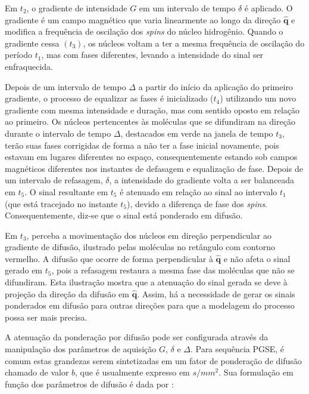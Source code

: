 \documentclass[
    12pt,                %
    oneside,            %
    a4paper,            %
    english,            %
    french,                %
    spanish,            %
    brazil                %
    ]{abntex2}
\begin{document}
Em $t_2$, o gradiente de intensidade $G$ em um intervalo de tempo $\delta$ é aplicado. O gradiente é um campo magnético que varia linearmente ao longo da direção $\mathbf{\hat{q}}$ e modifica a frequência de oscilação dos \textit{spins} do núcleo hidrogênio. Quando o gradiente cessa $(t_3)$, os núcleos voltam a ter a mesma frequência de oscilação do período $t_1$, mas com fases diferentes, levando a intensidade do sinal ser enfraquecida.

Depois de um intervalo de tempo $\Delta$ a partir do início da aplicação do primeiro gradiente, o processo de equalizar as fases é inicializado ($t_4$) utilizando um novo gradiente com mesma intensidade e duração, mas com sentido oposto em relação ao primeiro. Os núcleos pertencentes às moléculas que se difundiram na direção durante o intervalo de tempo $\Delta$, destacados em verde na janela de tempo $t_3$, terão suas fases corrigidas de forma a não ter a fase inicial novamente, pois estavam em lugares diferentes no espaço, consequentemente estando sob campos magnéticos diferentes nos instantes de defasagem e equalização de fase. Depois de um intervalo de refasagem, $\delta$, a intensidade do gradiente volta a ser balanceada em $t_5$.
O sinal resultante em $t_5$ é atenuado em relação ao sinal ao intervalo $t_1$ (que está tracejado no instante $t_5$), devido a diferença de fase dos \textit{spins}. Consequentemente, diz-se que o sinal está ponderado em difusão.

Em $t_3$, perceba a movimentação dos núcleos em direção perpendicular ao gradiente de difusão, ilustrado pelas moléculas no retângulo com contorno vermelho. A difusão que ocorre de forma perpendicular à $\mathbf{\hat{q}}$ e não afeta o sinal gerado em $t_5$, pois a refasagem restaura a mesma fase das moléculas que não se difundiram. Esta ilustração mostra que a atenuação do sinal gerada se deve à projeção da direção da difusão em $\mathbf{\hat{q}}$. Assim, há a necessidade de gerar os sinais ponderados em difusão para outras direções para que a modelagem do processo possa ser mais precisa.

A atenuação da ponderação por difusão pode ser configurada através da manipulação dos parâmetros de aquisição  $G$,  $\delta$ e $\Delta$. Para sequência PGSE, é comum estas grandezas serem sintetizadas em um fator de ponderação de difusão chamado de valor $b$, que é usualmente expresso em $s/mm^2$. Sua formulação em função dos parâmetros de difusão é dada por \cite{DTI_Handbook}:

\end{document}
